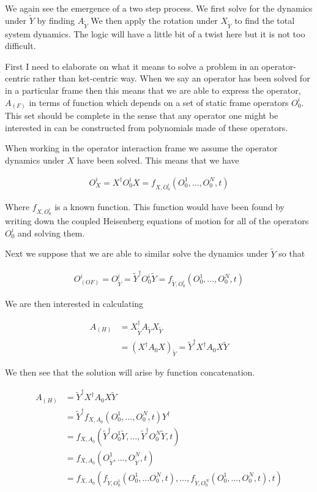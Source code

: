 \documentclass[12pt]{article}
\begin{document}
We again see the emergence of a two step process. We first solve for the dynamics under $\tilde{Y}$ by finding $A_{\tilde{Y}}$ We then apply the rotation under $X_{\tilde{Y}}$ to find the total system dynamics. The logic will have a little bit of a twist here but it is not too difficult.

First I need to elaborate on what it means to solve a problem in an operator-centric rather than ket-centric way. When we say an operator has been solved for in a particular frame then this means that we are able to express the operator, $A_{(F)}$ in terms of function which depends on a set of static frame operators ${O_0^i}$. This set should be complete in the sense that any operator one might be interested in can be constructed from polynomials made of these operators.

When working in the operator interaction frame we assume the operator dynamics under $X$ have been solved. This means that we have

\begin{align}
O_X^i = X^{\dag}O_0^i X = f_{X,O_0^i}(O_0^1, \ldots, O_0^N,t)
\end{align}

Where $f_{X,O_0^i}$ is a known function. This function would have been found by writing down the coupled Heisenberg equations of motion for all of the operators ${O_0^i}$ and solving them.

Next we suppose that we are able to similar solve the dynamics under $\tilde{Y}$ so that

\begin{align}
O_{(OF)}^i = O_{\tilde{Y}}^i = \tilde{Y}^{\dag}O_0^i \tilde{Y} = f_{\tilde{Y},O_0^i}(O_0^1, \ldots, O_0^N,t)
\end{align}

We are then interested in calculating

\begin{align}
A_{(H)} &= X_{\tilde{Y}}^{\dag} A_{\tilde{Y}} X_{\tilde{Y}}\\
&= \left(X^{\dag} A_0 X \right)_{\tilde{Y}} = \tilde{Y}^{\dag} X^{\dag} A_0 X \tilde{Y}
\end{align}

We then see that the solution will arise by function concatenation.

\begin{align}
A_{(H)} &= \tilde{Y}^{\dag} X^{\dag} A_0 X \tilde{Y}\\
&= \tilde{Y}^{\dag}f_{X,A_0}\left(O_0^1,\ldots, O_0^N,t\right) Y^{\dag}\\
&= f_{X,A_0}\left(\tilde{Y}^{\dag}O_0^1\tilde{Y},\ldots, \tilde{Y}^{\dag}O_0^N\tilde{Y},t \right)\\
&= f_{X,A_0}\left(O_{\tilde{Y}}^1,\ldots, O_{\tilde{Y}}^N,t \right)\\
&= f_{X,A_0}\left(f_{\tilde{Y},O_0^1}(O_0^1,\ldots O_0^N,t),\ldots, f_{\tilde{Y},O_0^N}(O_0^1,\ldots,O_0^N,t),t \right)
\end{align}
\end{document}
